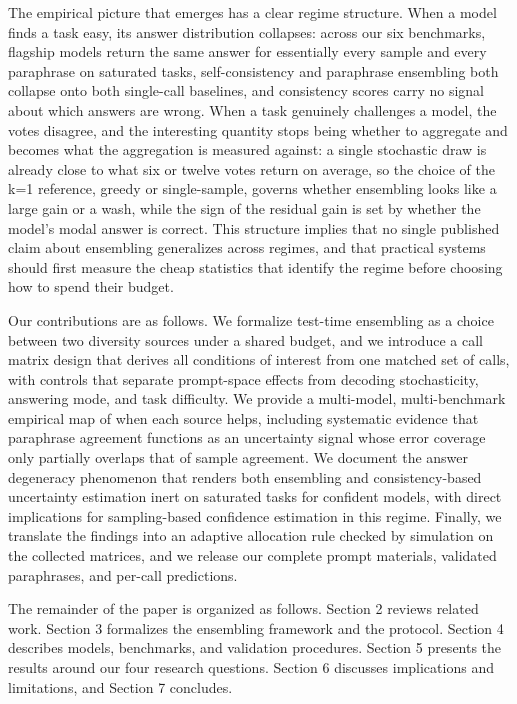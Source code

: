 \documentclass[preprint,12pt]{elsarticle}
\begin{document}
The empirical picture that emerges has a clear regime structure. When a model finds a task easy, its answer distribution collapses: across our six benchmarks, flagship models return the same answer for essentially every sample and every paraphrase on saturated tasks, self-consistency and paraphrase ensembling both collapse onto both single-call baselines, and consistency scores carry no signal about which answers are wrong. When a task genuinely challenges a model, the votes disagree, and the interesting quantity stops being whether to aggregate and becomes what the aggregation is measured against: a single stochastic draw is already close to what six or twelve votes return on average, so the choice of the k=1 reference, greedy or single-sample, governs whether ensembling looks like a large gain or a wash, while the sign of the residual gain is set by whether the model's modal answer is correct. This structure implies that no single published claim about ensembling generalizes across regimes, and that practical systems should first measure the cheap statistics that identify the regime before choosing how to spend their budget.

Our contributions are as follows. We formalize test-time ensembling as a choice between two diversity sources under a shared budget, and we introduce a call matrix design that derives all conditions of interest from one matched set of calls, with controls that separate prompt-space effects from decoding stochasticity, answering mode, and task difficulty. We provide a multi-model, multi-benchmark empirical map of when each source helps, including systematic evidence that paraphrase agreement functions as an uncertainty signal whose error coverage only partially overlaps that of sample agreement. We document the answer degeneracy phenomenon that renders both ensembling and consistency-based uncertainty estimation inert on saturated tasks for confident models, with direct implications for sampling-based confidence estimation in this regime. Finally, we translate the findings into an adaptive allocation rule checked by simulation on the collected matrices, and we release our complete prompt materials, validated paraphrases, and per-call predictions.

The remainder of the paper is organized as follows. Section 2 reviews related work. Section 3 formalizes the ensembling framework and the protocol. Section 4 describes models, benchmarks, and validation procedures. Section 5 presents the results around our four research questions. Section 6 discusses implications and limitations, and Section 7 concludes.
\end{document}
